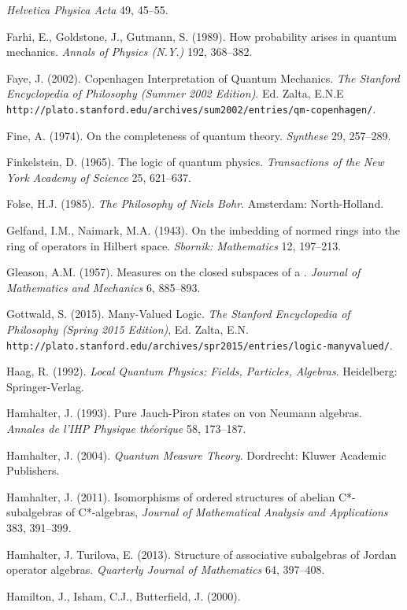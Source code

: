 \documentclass[12pt]{article}
\begin{document}
\begin{footnotesize}
\begin{trivlist}
 \emph{Helvetica Physica Acta}  49, 45--55.
\item 
 Farhi,  E.,  Goldstone, J.,  Gutmann, S. (1989). How probability arises in quantum mechanics.
 \emph{Annals of Physics (N.Y.)} 192, 368--382. 
\item   Faye, J. (2002). Copenhagen Interpretation of Quantum Mechanics.
\emph{The Stanford Encyclopedia of Philosophy (Summer 2002 Edition)}. Ed.  Zalta, E.N.E \\ \texttt{http://plato.stanford.edu/archives/sum2002/entries/qm-copenhagen/}.    
\item
 Fine, A. (1974). On the completeness of quantum theory. \emph{Synthese} 29, 257--289.
 \item  Finkelstein, D. (1965). The logic of quantum physics. \emph{Transactions of the New York Academy of Science} 25, 621--637.  
\item Folse, H.J. (1985). \emph{ The Philosophy of Niels Bohr}. Amsterdam: North-Holland.
\item  Gelfand, I.M., Naimark, M.A. (1943). On the imbedding of normed rings into the ring of operators in Hilbert space.
\emph{Sbornik: Mathematics} 12, 197--213.
\item Gleason, A.M. (1957). Measures on the closed subspaces of a \Hs. \emph{Journal of Mathematics and Mechanics}
6, 885--893.
\item Gottwald, S. (2015).
 Many-Valued Logic. \emph{The Stanford Encyclopedia of Philosophy (Spring 2015 Edition)}, Ed. Zalta, E.N. 
 \verb#http://plato.stanford.edu/archives/spr2015/entries/logic-manyvalued/#.
\item   Haag, R. (1992).   \emph{Local Quantum Physics: Fields, Particles, Algebras}. 
Heidelberg: Springer-Verlag.  
\item  Hamhalter, J. (1993).  Pure Jauch-Piron states on von Neumann algebras.
\emph{Annales de l'IHP Physique th\'{e}orique} 58, 173--187.
\item Hamhalter, J. (2004). \emph{Quantum Measure Theory}. Dordrecht: Kluwer Academic Publishers.
\item  Hamhalter,  J. (2011).
Isomorphisms of ordered structures of abelian C*-subalgebras of C*-algebras,
\emph{Journal of Mathematical Analysis and Applications} 383, 391--399.
\item  Hamhalter,  J.  Turilova, E. (2013). Structure of associative subalgebras of Jordan operator algebras.
\emph{Quarterly Journal of Mathematics}  64,  397--408.
\item Hamilton, J., Isham, C.J.,  Butterfield, J. (2000).

\end{trivlist}
\end{footnotesize}
\end{document}
